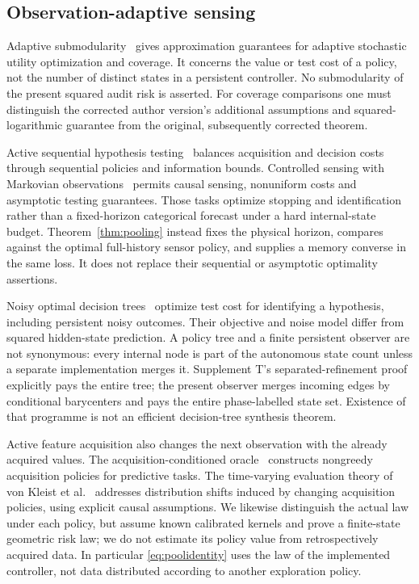 \subsection{Observation-adaptive sensing}
Adaptive submodularity~\cite{golovin} gives approximation guarantees for adaptive stochastic utility optimization and coverage. It concerns the value or test cost of a policy, not the number of distinct states in a persistent controller. No submodularity of the present squared audit risk is asserted. For coverage comparisons one must distinguish the corrected author version's additional assumptions and squared-logarithmic guarantee from the original, subsequently corrected theorem.

Active sequential hypothesis testing~\cite{naghshvar} balances acquisition and decision costs through sequential policies and information bounds. Controlled sensing with Markovian observations~\cite{nitinawarat} permits causal sensing, nonuniform costs and asymptotic testing guarantees. Those tasks optimize stopping and identification rather than a fixed-horizon categorical forecast under a hard internal-state budget. Theorem~\ref{thm:pooling} instead fixes the physical horizon, compares against the optimal full-history sensor policy, and supplies a memory converse in the same loss. It does not replace their sequential or asymptotic optimality assertions.

Noisy optimal decision trees~\cite{jia} optimize test cost for identifying a hypothesis, including persistent noisy outcomes. Their objective and noise model differ from squared hidden-state prediction. A policy tree and a finite persistent observer are not synonymous: every internal node is part of the autonomous state count unless a separate implementation merges it. Supplement T's separated-refinement proof explicitly pays the entire tree; the present observer merges incoming edges by conditional barycenters and pays the entire phase-labelled state set. Existence of that programme is not an efficient decision-tree synthesis theorem.

Active feature acquisition also changes the next observation with the already acquired values. The acquisition-conditioned oracle~\cite{valancius} constructs nongreedy acquisition policies for predictive tasks. The time-varying evaluation theory of von Kleist et al.~\cite{kleist} addresses distribution shifts induced by changing acquisition policies, using explicit causal assumptions. We likewise distinguish the actual law under each policy, but assume known calibrated kernels and prove a finite-state geometric risk law; we do not estimate its policy value from retrospectively acquired data. In particular \eqref{eq:poolidentity} uses the law of the implemented controller, not data distributed according to another exploration policy.

